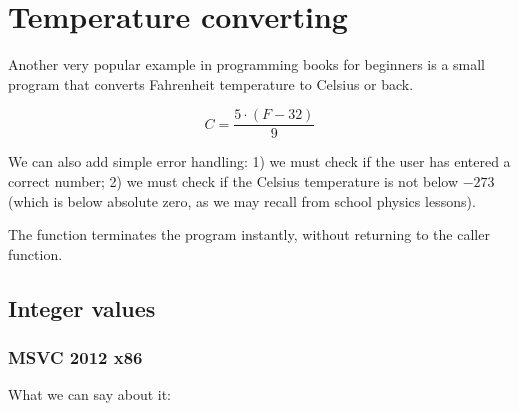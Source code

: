 \section{Temperature converting}

Another very popular example in 
programming books for beginners is a small program that converts Fahrenheit temperature to Celsius or back.

\[
	C=\frac{5 \cdot (F-32)}{9}
\]

We can also add simple error handling:
1) we must check if the user has entered a correct number;
2) we must check if the Celsius temperature is not below $-273$ 
(which is below absolute zero, as we may recall from school physics lessons).

The  function terminates 
the program instantly, without returning to the \gls{caller} function.

\subsection{Integer values}



\subsubsection{\Optimizing MSVC 2012 x86}



What we can say about it:


